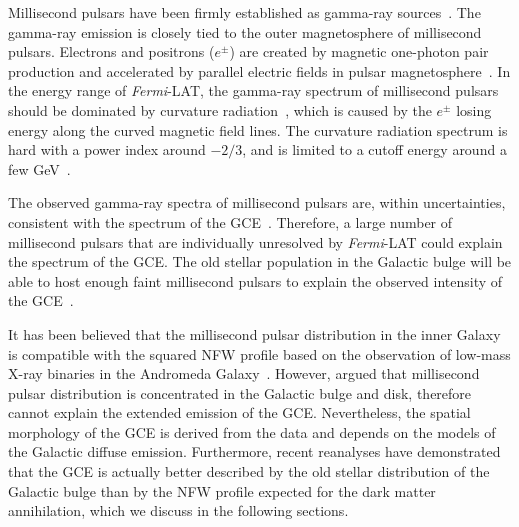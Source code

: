 \documentclass[doublespace,nopageskip]{VTthesis}
\begin{document}
Millisecond pulsars have been firmly established as gamma-ray sources~\citep{1996A&A...311L...9V,2009ApJ...699.1171A,2013MNRAS.430..571E,2013ApJS..208...17A}. The gamma-ray emission is closely tied to the outer magnetosphere of millisecond pulsars. 
{Electrons and positrons ($e^\pm$) are created by magnetic one-photon pair production and accelerated by parallel electric fields in pulsar magnetosphere~\cite{2021arXiv210105751H}.}
In the energy range of \textit{Fermi}-LAT, the gamma-ray spectrum of millisecond pulsars should be dominated by curvature radiation~\cite{2013ApJS..208...17A}, which is caused by the $e^\pm$ losing energy along the curved magnetic field lines. The curvature radiation spectrum is hard {with a power index around $-2/3$}, and is limited to a cutoff energy around a few GeV~\cite{2005ApJ...622..531H}.

The observed gamma-ray spectra of millisecond pulsars are, within uncertainties, consistent with the spectrum of the GCE~\cite{2011JCAP...03..010A}. Therefore, a large number of millisecond pulsars that are individually unresolved by \textit{Fermi}-LAT could explain the spectrum of the GCE. The old stellar population in the Galactic bulge will be able to host enough faint millisecond pulsars to explain the observed intensity of the GCE~\cite{2018ApJ...863..199G,2020JCAP...12..035P}.

It has been believed that the millisecond pulsar distribution in the inner Galaxy is compatible with the squared NFW profile based on the observation of low-mass X-ray binaries in the Andromeda Galaxy~\cite{2012PhRvD..86h3511A}. However, \citet{2013PhRvD..88h3009H} argued that millisecond pulsar distribution is concentrated in the Galactic bulge and disk, therefore cannot explain the extended emission of the GCE. Nevertheless, the spatial morphology of the GCE is derived from the data and depends on the models of the Galactic diffuse emission. Furthermore, recent reanalyses have demonstrated that the GCE is actually better described by the old stellar distribution of the Galactic bulge than by the NFW profile expected for the dark matter annihilation, which we discuss in the following sections.



\end{document}
